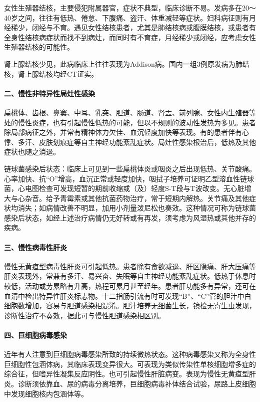 女性生殖器结核，主要侵犯附属器官，症状不典型，临床诊断不易。发病多在20～40岁之间，往往有低热、倦怠、下腹痛、盗汗、体重减轻等症状。妇科病征则有月经稀少，闭经与不育。遇见女性结核患者，尤其是肺结核病或腹膜结核，或患者有全身性结核病症状而找不到病灶，而同时有不育症，月经稀少或闭经，应考虑女性生殖器结核的可能性。

肾上腺结核少见，此病临床上往往表现为Addison病。国内一组3例原发病为肺结核，肾上腺结核均经CT证实。

\paragraph{二、慢性非特异性局灶性感染}

扁桃体、齿根、鼻窦、中耳、乳突、胆道、肠道、肾盂、前列腺、女性内生殖器等处的慢性炎症，也有引起慢性低热的可能，但以不规则的波动性发热为多见。患者除局部病征之外，并常有精神体力欠佳、血沉轻度加快等表现。有的患者伴有心悸、多汗、皮肤划痕症等自主神经功能紊乱症状。局灶性感染根治后，低热及其他症状也随之消退。

链球菌感染后状态：临床上可见到一些扁桃体炎或咽炎之后出现低热、关节酸痛。心率加快、抗“O”增高，血沉正常或轻度加快，咽拭子培养可证明乙型溶血性链球菌，心电图检查可发现短暂的期前收缩或（及）轻度S-T段与T波改变。无心脏增大与心杂音。给予青霉素或其他抗菌药物治疗，常于短期内解热。关节痛及其他症状均消失；如病情改善不明显，加用小剂量泼尼松也奏效。这种情况可称为链球菌感染后状态，如经上述治疗病情仍无好转或有再发，须考虑为风湿热或其他并存的疾病。

\paragraph{三、慢性病毒性肝炎}

慢性无黄疸型病毒性肝炎可引起低热。患者除有食欲减退、肝区隐痛、肝大压痛等肝炎表现外，常兼有多汗、易兴奋、失眠等自主神经功能紊乱症状。低热于休息时较低，活动或劳累略有升高，热程可累月甚至经年。患者肝功能多有异常，还可在血清中检出特异性肝炎标志物。十二指肠引流有时可发现“B”、“C”管的胆汁中白细胞数增加，容易与胆道感染相混淆。胆汁培养无细菌生长，镜检无寄生虫发现，诊断性治疗不奏效，据此可与慢性胆道感染相区别。

\paragraph{四、巨细胞病毒感染}

近年有人注意到巨细胞病毒感染所致的持续微热状态。这种病毒感染又称为全身性巨细胞性包涵体病，其临床表现变异很大。可表现为类似传染性单核细胞增多症的综合征，但嗜异性凝集反应阴性。也可引起慢性肝脏病变。表现为慢性无黄疸型肝炎。诊断须依靠血、尿的病毒分离培养，巨细胞病毒补体结合试验，尿路上皮细胞中发现细胞核内包涵体等。

